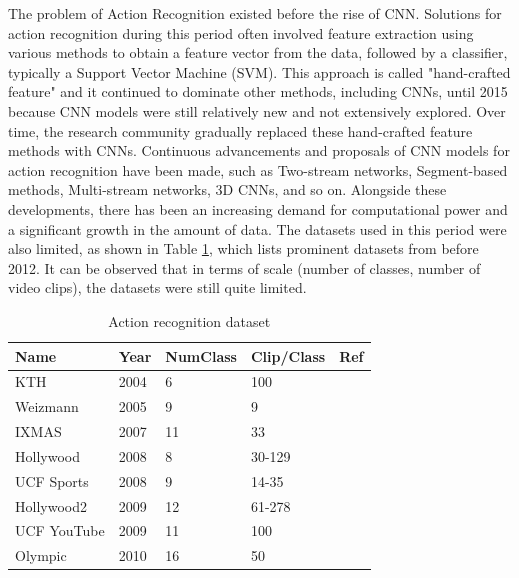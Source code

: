 \documentclass[a4paper]{article}
\begin{document}
The problem of Action Recognition existed before the rise of CNN. Solutions for
action recognition during this period often involved feature extraction using
various methods to obtain a feature vector from the data, followed by a
classifier, typically a Support Vector Machine (SVM). This approach is called
"hand-crafted feature" and it continued to dominate other methods, including
CNNs, until 2015 because CNN models were still relatively new and not
extensively explored. Over time, the research community gradually replaced these
hand-crafted feature methods with CNNs. Continuous advancements and proposals of
CNN models for action recognition have been made, such as Two-stream networks,
Segment-based methods, Multi-stream networks, 3D CNNs, and so on. Alongside
these developments, there has been an increasing demand for computational power
and a significant growth in the amount of data. The datasets used in this period
were also limited, as shown in Table \ref{config}, which lists prominent
datasets from before 2012. It can be observed that in terms of scale (number of
classes, number of video clips), the datasets were still quite limited.

\begin{table}[h]
	\centering
	\caption{Action recognition dataset}
	\begin{tabular}{l|l l l l}
		\toprule
		Name & Year & NumClass & Clip/Class & Ref \\
		\midrule
		KTH & 2004 & 6 & 100 & \cite{KTH} \\
		Weizmann & 2005 & 9 & 9 & \cite{Weizmann} \\
		IXMAS & 2007 & 11 & 33 & \cite{IXMAS} \\
		Hollywood & 2008 & 8 & 30-129 & \cite{HollyWood} \\
		UCF Sports & 2008 & 9 & 14-35 & \cite{UCFSports} \\
		Hollywood2 & 2009 & 12 & 61-278 & \cite{Hollywood2} \\
		UCF YouTube & 2009 & 11 & 100 & \cite{UCFYouTube} \\
		Olympic & 2010 & 16 & 50 & \cite{Olympic} \\
		\bottomrule
	\end{tabular}%
	\label{config}
\end{table}%
\end{document}
